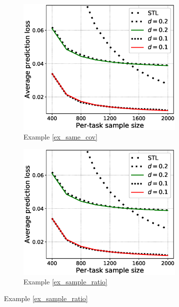 \begin{figure}[!t]
	\begin{subfigure}[b]{0.5\textwidth}
		\centering
		\includegraphics[width=0.9\textwidth]{figures/same_covariates.eps}
		\caption{Example \ref{ex_same_cov}}
		\label{fig_same_cov}
	\end{subfigure}\hfill
	\begin{subfigure}[b]{0.5\textwidth}
		\centering
		\includegraphics[width=0.9\textwidth]{figures/same_covariates.eps}
		\caption{Example \ref{ex_sample_ratio}}
		\label{fig_width}
	\end{subfigure}

\end{figure}
